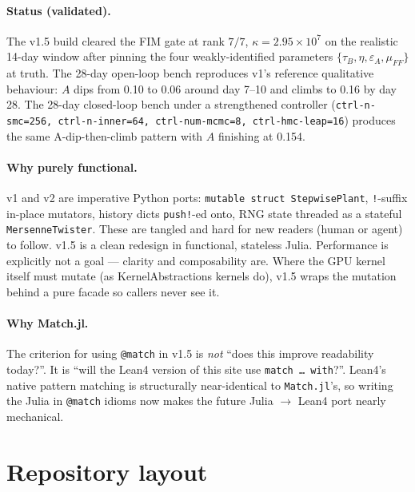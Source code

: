 \documentclass[11pt,a4paper]{article}
\begin{document}
\paragraph{Status (validated).}
The v1.5 build cleared the FIM gate at rank $7/7$, $\kappa = 2.95
\times 10^7$ on the realistic 14-day window after pinning the four
weakly-identified parameters $\{\tau_B, \eta, \varepsilon_A,
\mu_{FF}\}$ at truth. The 28-day open-loop bench reproduces v1's
reference qualitative behaviour: $A$ dips from 0.10 to 0.06 around
day 7--10 and climbs to 0.16 by day 28. The 28-day closed-loop bench
under a strengthened controller (\texttt{ctrl-n-smc=256,
ctrl-n-inner=64, ctrl-num-mcmc=8, ctrl-hmc-leap=16}) produces the
same A-dip-then-climb pattern with $A$ finishing at 0.154.

\paragraph{Why purely functional.}
v1 and v2 are imperative Python ports: \texttt{mutable struct
StepwisePlant}, \texttt{!}-suffix in-place mutators, history dicts
\texttt{push!}-ed onto, RNG state threaded as a stateful
\texttt{MersenneTwister}. These are tangled and hard for new readers
(human or agent) to follow. v1.5 is a clean redesign in functional,
stateless Julia. Performance is explicitly not a goal --- clarity
and composability are. Where the GPU kernel itself must mutate (as
KernelAbstractions kernels do), v1.5 wraps the mutation behind a
pure facade so callers never see it.

\paragraph{Why Match.jl.}
The criterion for using \texttt{@match} in v1.5 is \emph{not} ``does
this improve readability today?''. It is ``will the Lean4 version of
this site use \texttt{match \dots\ with}?''. Lean4's native pattern
matching is structurally near-identical to \texttt{Match.jl}'s, so
writing the Julia in \texttt{@match} idioms now makes the future
Julia $\to$ Lean4 port nearly mechanical.

\section{Repository layout}
\label{sec:layout}
\end{document}

